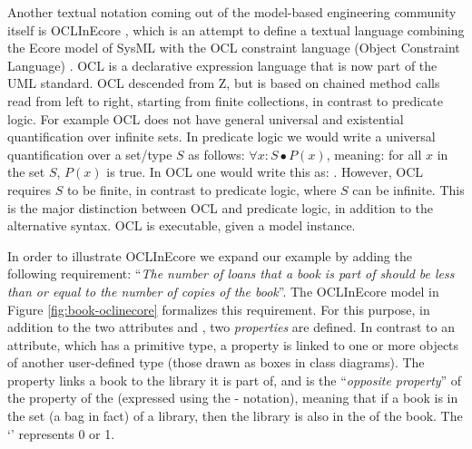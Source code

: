 Another textual notation coming out of the model-based engineering community itself is OCLInEcore \cite{oclinecore}, 
which is an attempt 
to define a textual language combining the Ecore model
of SysML with the OCL constraint language (Object Constraint 
Language) 
\cite{ocl}. OCL is a declarative expression language that is now 
part of the UML 
standard. OCL descended from Z, but is based on chained method 
calls read from left to right, starting from finite collections, 
in contrast to predicate logic. For example OCL does not have
general universal and existential quantification over infinite 
sets. In predicate 
logic we would write a universal quantification over a set/type 
$S$ as follows: $\forall x : S \bullet P(x)$, meaning: for all $x$ in the set $S$, $P(x)$ is true. In OCL one would 
write this as:
. However, OCL requires $S$ to be 
finite,
in contrast to predicate logic, where $S$ can be infinite. This
is the major distinction between OCL and predicate logic, in 
addition to the alternative syntax. OCL is executable, given
a model instance.



%   

In order to illustrate OCLInEcore we expand our example by adding 
the following requirement: ``{\em The number of loans that a book 
is part of should be less than or equal to the 
number of copies of the book}''. The OCLInEcore model 
in Figure \ref{fig:book-oclinecore} formalizes this requirement.
For this purpose, in addition to the two attributes  and , two {\em properties} are defined. 
In contrast to an attribute, 
which has a primitive type, a property is linked to one or 
more objects of another user-defined 
type (those drawn as boxes in class diagrams).
The property  links a book to the library it is part 
of, and is the ``{\em opposite property}'' of the  
property of the  (expressed using the \iocl{#}-
notation), meaning that if a book is in the  set (a 
bag in fact) of a library, then the library is also in the 
 of the book. The `' represents 0 or 1.

